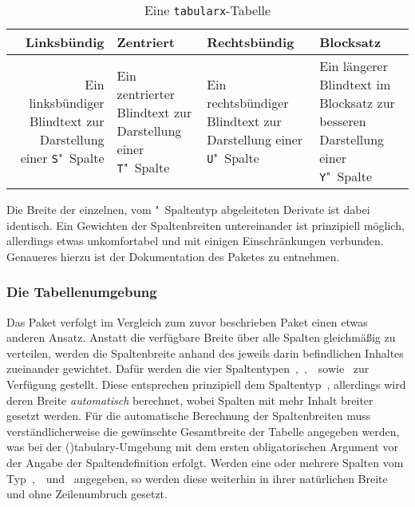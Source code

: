 \documentclass[%
  english,ngerman,%
  cdgeometry=no,DIV=12,%
  cd=false,cdfont=false,cdtitle=true,%
  headings=normal,%
  automark,%
  listof=toc,%
]{tudscrartcl}
\begin{document}
\begin{Trunk}
\begin{table}
\begin{tabularx}{\textwidth}{@{}DEFY@{}}
\toprule
\textbf{Linksbündig} & \textbf{Zentriert} & 
\textbf{Rechtsbündig} & \textbf{Blocksatz} \tabularnewline
\midrule
Ein linksbündiger Blindtext 
  zur Darstellung einer \texttt{S}"~Spalte &
Ein zentrierter Blindtext 
  zur Darstellung einer \texttt{T}"~Spalte &
Ein rechtsbündiger Blindtext 
  zur Darstellung einer \texttt{U}"~Spalte &
Ein längerer Blindtext im Blocksatz 
  zur besseren Darstellung einer \texttt{Y}"~Spalte
\tabularnewline\bottomrule
\end{tabularx}
\caption{Eine \texttt{tabularx}-Tabelle\label{tab:tabularx}}
\end{table}

\end{Trunk}
\InputCode\noindent
%
Die Breite der einzelnen, vom "~Spaltentyp abgeleiteten Derivate ist 
dabei identisch. Ein Gewichten der Spaltenbreiten untereinander ist prinzipiell 
möglich, allerdings etwas unkomfortabel und mit einigen Einschränkungen 
verbunden. Genaueres hierzu ist der Dokumentation des Paketes 
 zu entnehmen.



\subsubsection{%
  Die Tabellenumgebung %
  \label{sec:tabulary}%
}

Das Paket  verfolgt im Vergleich zum zuvor beschrieben Paket 
 einen etwas anderen Ansatz. Anstatt die verfügbare Breite 
über alle Spalten gleichmäßig zu verteilen, werden die Spaltenbreite anhand des 
jeweils darin befindlichen Inhaltes zueinander gewichtet. Dafür werden die vier 
Spaltentypen~,~,~~sowie~ zur Verfügung 
gestellt. Diese entsprechen prinzipiell dem Spaltentyp~, allerdings 
wird deren Breite \emph{automatisch} berechnet, wobei Spalten mit mehr Inhalt 
breiter gesetzt werden. Für die automatische Berechnung der Spaltenbreiten muss 
verständlicherweise die gewünschte Gesamtbreite der Tabelle angegeben werden, 
was bei der \Environment(){tabulary}-Umgebung mit dem ersten 
obligatorischen Argument vor der Angabe der Spaltendefinition erfolgt. Werden 
eine oder mehrere Spalten vom Typ~,~~und~ 
angegeben, so werden diese weiterhin in ihrer natürlichen Breite und ohne 
Zeilenumbruch gesetzt. 
\end{document}
